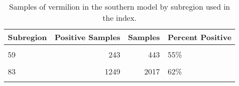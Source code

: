 \documentclass[
]{article}
\begin{document}
\begin{table}

\caption{\label{tab:tab-region-crfspr}Samples of vermilion in the southern model by subregion used in the index.}
\centering
\begin{tabular}[t]{lrrl}
\toprule
Subregion & Positive Samples & Samples & Percent Positive\\
\midrule
\cellcolor{gray!6}{37} & \cellcolor{gray!6}{1515} & \cellcolor{gray!6}{2617} & \cellcolor{gray!6}{58\%}\\
59 & 243 & 443 & 55\%\\
\cellcolor{gray!6}{73} & \cellcolor{gray!6}{1718} & \cellcolor{gray!6}{2904} & \cellcolor{gray!6}{59\%}\\
83 & 1249 & 2017 & 62\%\\
\cellcolor{gray!6}{111} & \cellcolor{gray!6}{2043} & \cellcolor{gray!6}{3972} & \cellcolor{gray!6}{51\%}\\
\bottomrule
\end{tabular}
\end{table}
\end{document}
